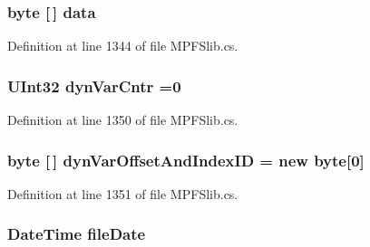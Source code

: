 \subsubsection[{data}]{\setlength{\rightskip}{0pt plus 5cm}byte \mbox{[}$\,$\mbox{]} data}\label{class_microchip_1_1_m_p_f_s_file_record_a0ad80c378fb4b5fe4bc8a855302c4ae1}


Definition at line 1344 of file M\+P\+F\+Slib.\+cs.

\hypertarget{class_microchip_1_1_m_p_f_s_file_record_ad6a2e5dcfd91bd0260a8854183375acf}{}
\subsubsection[{dyn\+Var\+Cntr}]{\setlength{\rightskip}{0pt plus 5cm}U\+Int32 dyn\+Var\+Cntr =0}\label{class_microchip_1_1_m_p_f_s_file_record_ad6a2e5dcfd91bd0260a8854183375acf}


Definition at line 1350 of file M\+P\+F\+Slib.\+cs.

\hypertarget{class_microchip_1_1_m_p_f_s_file_record_ad3a069e40c353aa918d06e8ae9e6c9ff}{}
\subsubsection[{dyn\+Var\+Offset\+And\+Index\+I\+D}]{\setlength{\rightskip}{0pt plus 5cm}byte \mbox{[}$\,$\mbox{]} dyn\+Var\+Offset\+And\+Index\+I\+D = new byte\mbox{[}0\mbox{]}}\label{class_microchip_1_1_m_p_f_s_file_record_ad3a069e40c353aa918d06e8ae9e6c9ff}


Definition at line 1351 of file M\+P\+F\+Slib.\+cs.

\hypertarget{class_microchip_1_1_m_p_f_s_file_record_a58b9754e89903d977e262f1867f630cc}{}
\subsubsection[{file\+Date}]{\setlength{\rightskip}{0pt plus 5cm}Date\+Time file\+Date}\label{class_microchip_1_1_m_p_f_s_file_record_a58b9754e89903d977e262f1867f630cc}



